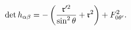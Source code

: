 \begin{equation*}
\det h_{\alpha \beta }=-\left( \frac{\frak{r}^{\prime 2}}{\sin ^{2}\theta }+%
\frak{r}^{2}\right) +F_{0\theta ^{\prime }}^{2}.
\end{equation*}

